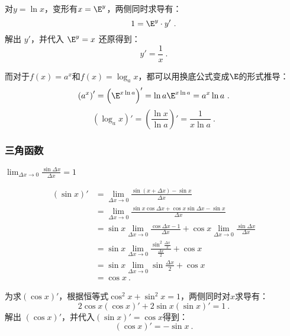 对$y=\ln x$，变形有$x=\E^y$，两侧同时求导有：
\begin{equation}
1=\E^y\cdot y'~.
\end{equation}
解出 $y'$，并代入 $\displaystyle \E^y=x$ 还原得到：
\begin{equation}
y'=\frac{1}{x}~.
\end{equation}

而对于$f(x)=a^x$和$f(x)=\log_a x$，都可以用换底公式变成$\E$的形式推导：
\begin{equation}
\left(a^x\right)'=\left(\E^{x\ln a}\right)'=\ln a\E^{x\ln a}=a^x\ln a~.
\end{equation}
\begin{equation}
\left(\log_a x\right)'=\left(\frac{\ln x}{\ln a}\right)'=\frac{1}{x\ln a}~.
\end{equation}

\subsubsection{三角函数}


$\displaystyle\lim_{\Delta x \to 0}\frac{\sin\Delta x} {\Delta x}=1$

\begin{equation}
\begin{split}
\left(\sin x\right)' &= \lim_{\Delta x \to 0}\frac{\sin (x+\Delta x)-\sin x}{\Delta x} \\
&= \lim_{\Delta x \to 0}\frac{\sin x\cos\Delta x+\cos x\sin\Delta x-\sin x}{\Delta x} \\
&= \sin x\lim_{\Delta x \to 0}\frac{\cos\Delta x-1}{\Delta x}+\cos x\lim_{\Delta x \to 0}\frac{\sin\Delta x} {\Delta x}\\
&= \sin x\lim_{\Delta x \to 0}\frac{\sin^2\frac{\Delta x}{2}}{\frac{\Delta x}{2}}+\cos x\\
&= \sin x\lim_{\Delta x \to 0}\sin\frac{\Delta x}{2}+\cos x\\
&=\cos x~.
\end{split}
\end{equation}

为求$(\cos x)'$，根据恒等式$\cos^2 x+\sin^2 x=1$，两侧同时对$x$求导有：
\begin{equation}
2\cos x(\cos x)'+2\sin x(\sin x)'=1~.
\end{equation}
解出 $(\cos x)'$，并代入$(\sin x)'=\cos x$得到：
\begin{equation}
(\cos x)'=-\sin x~.
\end{equation}

